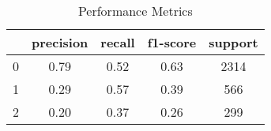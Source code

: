 \documentclass{article}%
\begin{document}
%
\normalsize%
\begin{table}[!ht]
    \centering
    \caption{Performance Metrics}
    \label{Table:performance_metrics}
    \begin{tabular}{|c|c|c|c|c|}
        \hline & precision & recall & f1-score & support\\
        \hline 0 & 0.79 & 0.52 & 0.63 & 2314\\
        \hline 1 & 0.29 & 0.57 & 0.39 & 566\\
        \hline 2 & 0.20 & 0.37 & 0.26 & 299\\
        \hline
    \end{tabular}
\end{table}%
\end{document}
